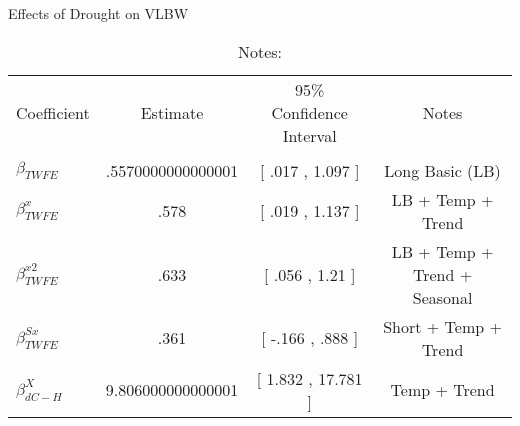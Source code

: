 \begin{table}[!ht]
\centering
\caption{Effects of Drought on VLBW}\label{tab:twfe_vlbw_test}
\fontsize{10pt}{12pt}\selectfont
\begin{tabular}{lccc}
\toprule
 \multicolumn{1}{c}{Coefficient}  &\multicolumn{1}{c}{Estimate}&\multicolumn{1}{c}{95\% Confidence Interval}&\multicolumn{1}{c}{Notes}\\\cmidrule(lr){2-2}\cmidrule(lr){3-3}\cmidrule(lr){4-4} \\
\midrule
 $ \beta_{TWFE} $ & .5570000000000001  & [ .017 ,  1.097 ] & Long Basic (LB) \\
 $ \beta^{x}_{TWFE} $ & .578  &  [ .019 ,  1.137  ] & LB + Temp + Trend \\
 $ \beta^{x2}_{TWFE} $ & .633  & [ .056 ,  1.21  ] & LB + Temp + Trend + Seasonal \\
 $ \beta^{Sx}_{TWFE} $ & .361  & [ -.166 ,  .888  ] & Short + Temp + Trend \\
 $ \beta^{X}_{dC-H} $ & 9.806000000000001  & [ 1.832 ,  17.781 ] & Temp + Trend \\
\bottomrule
\end{tabular}
\caption*{\footnotesize{Notes:}}
\end{table}
